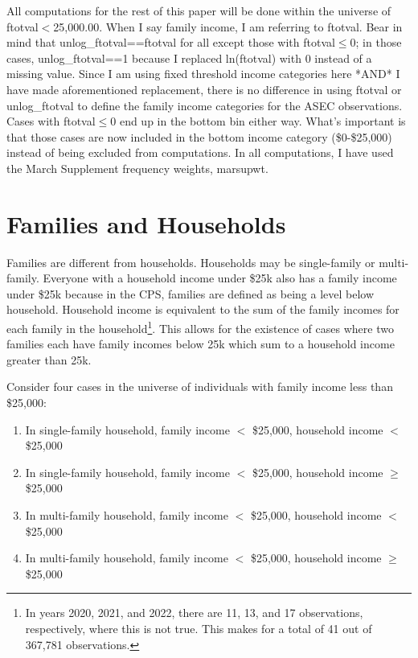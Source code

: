 \documentclass{article}
\begin{document}
	All computations for the rest of this paper will be done within the universe of ftotval$<$25,000.00. When I say family income, I am referring to ftotval. Bear in mind that unlog\_ftotval==ftotval for all except those with ftotval$\le$0; in those cases, unlog\_ftotval==1 because I replaced ln(ftotval) with 0 instead of a missing value. Since I am using fixed threshold income categories here *AND* I have made aforementioned replacement, there is no difference in using ftotval or unlog\_ftotval to define the family income categories for the ASEC observations. Cases with ftotval$\le$0 end up in the bottom bin either way. What's important is that those cases are now included in the bottom income category (\$0-\$25,000) instead of being excluded from computations. In all computations, I have used the March Supplement frequency weights, marsupwt.
	
	\section{Families and Households} Families are different from households. Households may be single-family or multi-family. Everyone with a household income under \$25k also has a family income under \$25k because in the CPS, families are defined as being a level below household. Household income is equivalent to the sum of the family incomes for each family in the household\footnote{In years 2020, 2021, and 2022, there are 11, 13, and 17 observations, respectively, where this is not true. This makes for a total of 41 out of 367,781 observations.}. This allows for the existence of cases where two families each have family incomes below 25k which sum to a household income greater than 25k. 
	
	Consider four cases in the universe of individuals with family income less than \$25,000:
	
	\begin{enumerate}
		\item In single-family household, family income $<$ \$25,000, household income $<$ \$25,000 
		\item In single-family household, family income $<$ \$25,000, household income $\ge$ \$25,000 
		\item In multi-family household, family income $<$ \$25,000, household income $<$ \$25,000
		\item In multi-family household, family income $<$ \$25,000, household income $\ge$ \$25,000
	\end{enumerate}
	
\end{document}
